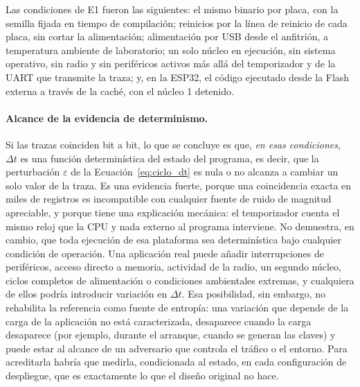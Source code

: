 Las condiciones de E1 fueron las siguientes: el mismo binario por placa, con la semilla fijada en tiempo de compilación; reinicios por la línea de reinicio de cada placa, sin cortar la alimentación; alimentación por USB desde el anfitrión, a temperatura ambiente de laboratorio; un solo núcleo en ejecución, sin sistema operativo, sin radio y sin periféricos activos más allá del temporizador y de la UART que transmite la traza; y, en la ESP32, el código ejecutado desde la Flash externa a través de la caché, con el núcleo 1 detenido.

\paragraph{Alcance de la evidencia de determinismo.} Si las trazas coinciden bit a bit, lo que se concluye es que, \emph{en esas condiciones}, $\Delta t$ es una función determinística del estado del programa, es decir, que la perturbación $\varepsilon$ de la Ecuación~\eqref{eq:ciclo_dt} es nula o no alcanza a cambiar un solo valor de la traza. Es una evidencia fuerte, porque una coincidencia exacta en miles de registros es incompatible con cualquier fuente de ruido de magnitud apreciable, y porque tiene una explicación mecánica: el temporizador cuenta el mismo reloj que la CPU y nada externo al programa interviene. No demuestra, en cambio, que toda ejecución de esa plataforma sea determinística bajo cualquier condición de operación. Una aplicación real puede añadir interrupciones de periféricos, acceso directo a memoria, actividad de la radio, un segundo núcleo, ciclos completos de alimentación o condiciones ambientales extremas, y cualquiera de ellos podría introducir variación en $\Delta t$. Esa posibilidad, sin embargo, no rehabilita la referencia como fuente de entropía: una variación que depende de la carga de la aplicación no está caracterizada, desaparece cuando la carga desaparece (por ejemplo, durante el arranque, cuando se generan las claves) y puede estar al alcance de un adversario que controla el tráfico o el entorno. Para acreditarla habría que medirla, condicionada al estado, en cada configuración de despliegue, que es exactamente lo que el diseño original no hace.

